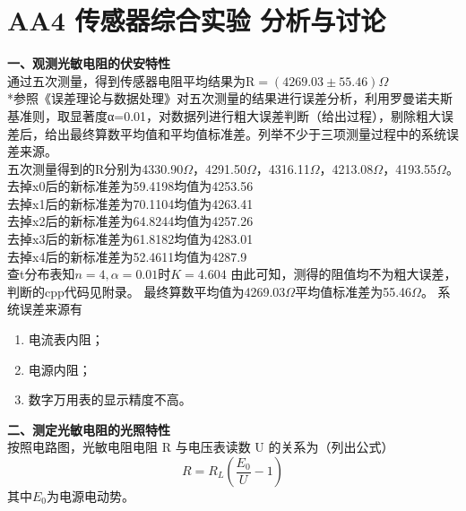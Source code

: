 \documentclass[dvipsnames, svgnames,a4paper,11pt]{article}
\begin{document}
\section{AA4 传感器综合实验 分析与讨论}
\textbf{一、观测光敏电阻的伏安特性}\\
通过五次测量，得到传感器电阻平均结果为$\text{R}=(4269.03\pm 55.46)\Omega$\\
{\color{red}*参照《误差理论与数据处理》对五次测量的结果进行误差分析，利用罗曼诺夫斯基准则，取显著度α=0.01，对数据列进行粗大误差判断（给出过程），剔除粗大误差后，给出最终算数平均值和平均值标准差。列举不少于三项测量过程中的系统误差来源。}\\
五次测量得到的R分别为4330.90$\Omega$，4291.50$\Omega$，4316.11$\Omega$，4213.08$\Omega$，4193.55$\Omega$。\\
去掉x0后的新标准差为59.4198均值为4253.56\\
去掉x1后的新标准差为70.1104均值为4263.41\\
去掉x2后的新标准差为64.8244均值为4257.26\\
去掉x3后的新标准差为61.8182均值为4283.01\\
去掉x4后的新标准差为52.4611均值为4287.9\\
查t分布表知$n=4,\alpha=0.01$时$K=4.604$
由此可知，测得的阻值均不为粗大误差，判断的cpp代码见附录。
最终算数平均值为4269.03$\Omega$平均值标准差为55.46$\Omega$。
系统误差来源有
\begin{enumerate}
	\item 电流表内阻；
	\item 电源内阻；
	\item 数字万用表的显示精度不高。
\end{enumerate}

\textbf{二、测定光敏电阻的光照特性}\\
按照电路图，光敏电阻电阻 R 与电压表读数 U 的关系为（列出公式）
$$R=R_L(\frac{E_0}{U}-1)$$
其中$E_0$为电源电动势。
\end{document}
